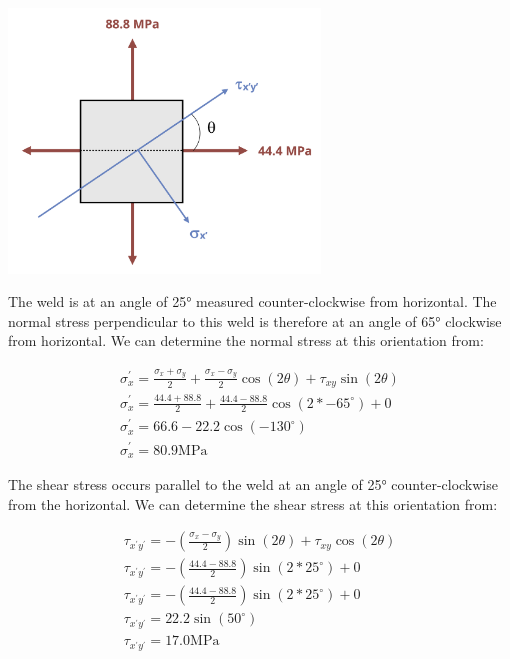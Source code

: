 \documentclass[
  letterpaper,
  DIV=11,
  numbers=noendperiod]{scrreprt}
\begin{document}
\begin{tcolorbox}
\begin{tcolorbox}
\begin{center}
\includegraphics[width=3.26042in,height=\textheight]{images/CH13 PNGs/example 13.2 part 2.png}
\end{center}

The weld is at an angle of 25° measured counter-clockwise from
horizontal. The normal stress perpendicular to this weld is therefore at
an angle of 65° clockwise from horizontal. We can determine the normal
stress at this orientation from:

\[
\begin{gathered}
\sigma_x^{\prime}=\frac{\sigma_x+\sigma_y}{2}+\frac{\sigma_x-\sigma_y}{2} \cos (2 \theta)+\tau_{x y} \sin (2 \theta) \\
\sigma_x^{\prime}=\frac{44.4+88.8}{2}+\frac{44.4-88.8}{2} \cos \left(2 *-65^{\circ}\right)+0 \\
\sigma_x^{\prime}=66.6-22.2 \cos \left(-130^{\circ}\right) \\
\sigma_x^{\prime}=80.9 \mathrm{MPa}
\end{gathered}
\]

The shear stress occurs parallel to the weld at an angle of 25°
counter-clockwise from the horizontal. We can determine the shear stress
at this orientation from:

\[
\begin{gathered}
\tau_{x^{\prime} y^{\prime}}=-\left(\frac{\sigma_x-\sigma_y}{2}\right) \sin (2 \theta)+\tau_{x y} \cos (2 \theta) \\
\tau_{x^{\prime} y^{\prime}}=-\left(\frac{44.4-88.8}{2}\right) \sin \left(2 * 25^{\circ}\right)+0 \\
\tau_{x^{\prime} y^{\prime}}=-\left(\frac{44.4-88.8}{2}\right) \sin \left(2 * 25^{\circ}\right)+0 \\
\tau_{x^{\prime} y^{\prime}}=22.2 \sin \left(50^{\circ}\right) \\
\tau_{x^{\prime} y^{\prime}}=17.0 \mathrm{MPa}
\end{gathered}
\]

\end{tcolorbox}

\end{tcolorbox}
\end{document}
